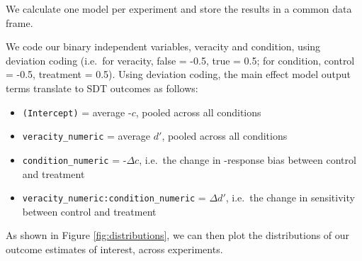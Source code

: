 \documentclass[
  man,mask,floatsintext]{apa6}
\providecommand{\tightlist}{%
  \setlength{\itemsep}{0pt}\setlength{\parskip}{0pt}}
\begin{document}
We calculate one model per experiment and store the results in a common data frame.

We code our binary independent variables, veracity and condition, using deviation coding (i.e.~for veracity, false = -0.5, true = 0.5; for condition, control = -0.5, treatment = 0.5). Using deviation coding, the main effect model output terms translate to SDT outcomes as follows:

\begin{itemize}
\tightlist
\item
  \texttt{(Intercept)} = average -\(c\), pooled across all conditions
\item
  \texttt{veracity\_numeric} = average \(d'\), pooled across all conditions
\item
  \texttt{condition\_numeric} = -\(\Delta c\), i.e.~the change in -response bias between control and treatment
\item
  \texttt{veracity\_numeric:condition\_numeric} = \(\Delta d'\), i.e.~the change in sensitivity between control and treatment
\end{itemize}

\begin{table}
\centering
\caption{\label{tab:example-outcome-exp1}Results of a generalize linear mixed model (glmm)}
\centering
{}
\end{table}

As shown in Figure \ref{fig:distributions}, we can then plot the distributions of our outcome estimates of interest, across experiments.
\end{document}
